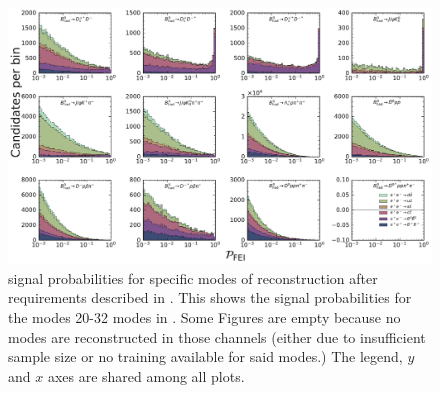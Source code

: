 \begin{figure}[htbp!]
    \ContinuedFloat
    \centering
    \includegraphics[width=1\textwidth]{figures/appendices/FEI_signal_probabilities/Bz_feiSigProbs2.pdf}
    \caption{\label{fig:feisigprobs4} \FEI signal probabilities for specific modes of \Bz reconstruction after requirements described in .
    This shows the signal probabilities for the modes 20-32 \Bz modes in .
    Some Figures are empty because no modes are reconstructed in those channels (either due to insufficient sample size or no training available for said modes.)
    The legend, $y$ and $x$ axes are shared among all plots.
    }
\end{figure}